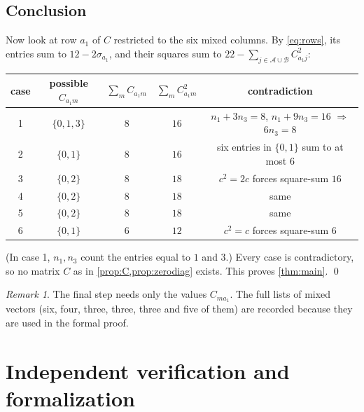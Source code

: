 \documentclass[11pt,a4paper]{amsart}
\theoremstyle{definition}
\theoremstyle{remark}
\newtheorem{remark}[theorem]{Remark}
\newcommand{\cA}{\mathcal{A}}
\newcommand{\cB}{\mathcal{B}}
\begin{document}
\subsection*{Conclusion}
Now look at row $a_1$ of $C$ restricted to the six mixed columns. By \eqref{eq:rows}, its entries sum to
$12-2\sigma_{a_1}$, and their squares sum to $22-\sum_{j\in\cA\cup\cB}C_{a_1j}^2$:
\begin{center}
\begin{tabular}{@{}ccccc@{}}
\toprule
case & possible $C_{a_1m}$ & $\sum_m C_{a_1m}$ & $\sum_mC_{a_1m}^2$ & contradiction\\
\midrule
1 & $\{0,1,3\}$ & $8$ & $16$ & $n_1+3n_3=8$, $n_1+9n_3=16$ $\Rightarrow$ $6n_3=8$\\
2 & $\{0,1\}$ & $8$ & $16$ & six entries in $\{0,1\}$ sum to at most $6$\\
3 & $\{0,2\}$ & $8$ & $18$ & $c^2=2c$ forces square-sum $16$\\
4 & $\{0,2\}$ & $8$ & $18$ & same\\
5 & $\{0,2\}$ & $8$ & $18$ & same\\
6 & $\{0,1\}$ & $6$ & $12$ & $c^2=c$ forces square-sum $6$\\
\bottomrule
\end{tabular}
\end{center}
(In case 1, $n_1,n_3$ count the entries equal to $1$ and $3$.) Every case is contradictory, so no matrix
$C$ as in \cref{prop:C,prop:zerodiag} exists. This proves \cref{thm:main}. \qed

\begin{remark}
The final step needs only the values $C_{ma_1}$. The full lists of mixed vectors (six, four, three, three,
three and five of them) are recorded because they are used in the formal proof.
\end{remark}

\section{Independent verification and formalization}\label{sec:verif}
\end{document}
